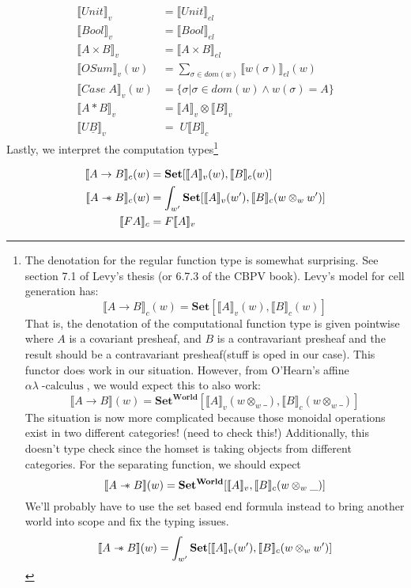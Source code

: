 \documentclass{article}
\newcommand{\den}[1]{\llbracket #1 \rrbracket}
\newcommand{\sep}{\mathrel{-\mkern-6mu*}}
\newcommand{\world}{{\mathbf{World}}}
\newcommand{\calculus}{\operatorname{-calculus}}
\begin{document}
\begin{align*}
    \llbracket Unit \rrbracket_v &= \llbracket Unit \rrbracket_{el}\\
    \llbracket Bool \rrbracket_v &= \llbracket Bool \rrbracket_{el}\\
    \llbracket A \times B \rrbracket_v &= \llbracket A \times B \rrbracket_{el}\\
    \llbracket OSum \rrbracket_v (w)&= \sum_{\sigma \in dom(w)} \llbracket w(\sigma) \rrbracket_{el}(w)\\
    \llbracket Case \; A \rrbracket_v(w) &= \{ \sigma | \sigma \in dom(w) \land w(\sigma)= A \} \\
    \llbracket A * B \rrbracket_v &= \llbracket A \rrbracket_v \otimes \llbracket B \rrbracket_v \\
    \llbracket U  \underline{B} \rrbracket_v &= \; U \llbracket B \rrbracket_c 
\end{align*}
Lastly, we interpret the computation types\footnote{ The denotation for the regular function type is somewhat surprising. 
See section 7.1 of Levy's thesis (or 6.7.3 of the CBPV book). Levy's model for cell generation has:
\[
    \den{A \rightarrow B}_c(w)= \mathbf{Set} [ \den{A}_v(w) , \den{B}_c(w) ]
\]
That is, the denotation of the computational function type is given pointwise where $A$ is a covariant presheaf, and $B$ is a
contravariant presheaf and the result should be a contravariant presheaf(stuff is oped in our case). 
This functor does work in our situation. However, from O'Hearn's affine $\alpha\lambda\calculus$, we would expect this to also work:
\[
    \den{A \rightarrow B}(w)= \mathbf{Set^{\world}}[ \den{A}_v(w \otimes_w \_) , \den{B}_c(w \otimes_w \_)]
\]
The situation is now more complicated because those monoidal operations exist in two different categories!
(need to check this!) Additionally, this doesn't type check since the homset is taking objects from different categories.
For the separating function, we should expect
\[
    \den{A \sep B}(w)= \mathbf{Set^{\world}}[ \den{A}_v , \den{B}_c(w \otimes_w \_)]
\]
We'll probably have to use the set based end formula instead to bring another world
into scope and fix the typing issues.
\[
    \den{A \sep B}(w)= \int_{w'} \mathbf{Set}[ \den{A}_v(w') , \den{B}_c(w \otimes_w w') ]
\]
}


\begin{align*}
    \den{A \rightarrow B }_c(w) &= \mathbf{Set}[ \den{A}_v(w) , \den{B}_c(w) ]\\
    \den{A \sep B}_c(w) &= \int_{w'} \mathbf{Set}[ \den{A}_v(w') , \den{B}_c(w \otimes_w w') ]\\
    \den{F A}_c &= F\den{A}_v\\
\end{align*}
\end{document}
